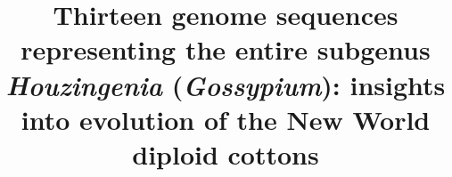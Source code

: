 \documentclass{bmcart}
\begin{document}
\begin{frontmatter}

\begin{fmbox}


\title{Thirteen genome sequences representing the entire subgenus \textit{Houzingenia} (\textit{Gossypium}): insights into evolution of the New World diploid cottons}

\author[
   addressref={aff1},                   %
   corref={aff1},                       %
   noteref={n1},                        %
   email={corrinne@iastate.edu}   %
]{ }
\author[
   addressref={aff2},
   email={maa146@igbb.msstate.edu}
]{ }
\author[
addressref={aff1},
email={jconover@iastate.edu}
]{ }
\author[
addressref={aff3},
email={Jodi.Scheffler@ARS.USDA.GOV}
]{ }
\author[
addressref={aff2},
email={william.s.sanders@gmail.com}
]{ }
\author[
addressref={aff2},
email={peterson@IGBB.msstate.edu}
]{ }
\author[
addressref={aff3},
email={Brian.Scheffler@ARS.USDA.GOV}
]{ }
\author[
addressref={aff1},
email={jfw@iastate.edu}
]{ }



\end{fmbox}
\end{frontmatter}
\end{document}
